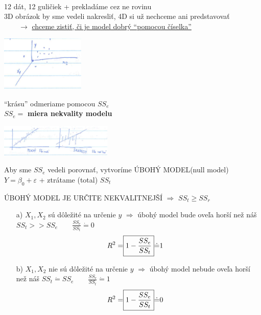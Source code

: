 \documentclass[unknownkeysallowed]{article}
\begin{document}
\begin{multicols}{2}

~\\
12 dát, 12 guličiek + prekladáme cez ne rovinu\\
3D obrázok by sme vedeli nakresliť, 4D si už nechceme ani predstavovať\\
$\qquad \to$ \underline{chceme zistiť, či je model dobrý ``pomocou číselka''}

\columnbreak

\includegraphics[width=0.3\textwidth]{imgs/obr30.png}

\end{multicols}

\begin{multicols}{2}

``krásu'' odmeriame pomocou $SS_e$\\
$SS_e = $ \textbf{miera nekvality modelu}

\columnbreak

\includegraphics[width=0.4\textwidth]{imgs/obr31.png}

\end{multicols}

Aby sme $SS_e$ vedeli porovnať, vytvoríme ÚBOHÝ MODEL(null model) $Y = \beta_0 + \varepsilon$ + ztrátame (total) $SS_t$

ÚBOHÝ MODEL JE URČITE NEKVALITNEJŠÍ $\Rightarrow$ $SS_t \geq SS_r$
\begin{itemize}
\item[a)] $X_1, X_2$ sú dôležité na určenie $y$ $\Rightarrow$ úbohý model bude oveľa horší než náš $SS_t >> SS_e \qquad \frac{SS_e}{SS_t} \dot{=} 0$
\begin{align*}
R^2 = \Aboxed{1-\frac{SS_e}{SS_t}} \dot{=}1
\end{align*}
\item[b)] $X_1, X_2$ nie sú dôležité na určenie $y$ $\Rightarrow$ úbohý model nebude oveľa horší než náš $SS_t \dot{=} SS_e \qquad \frac{SS_e}{SS_t} \dot{=} 1$
\begin{align*}
R^2 = \Aboxed{1-\frac{SS_e}{SS_t}} \dot{=}0
\end{align*}
\end{itemize}
\end{document}
